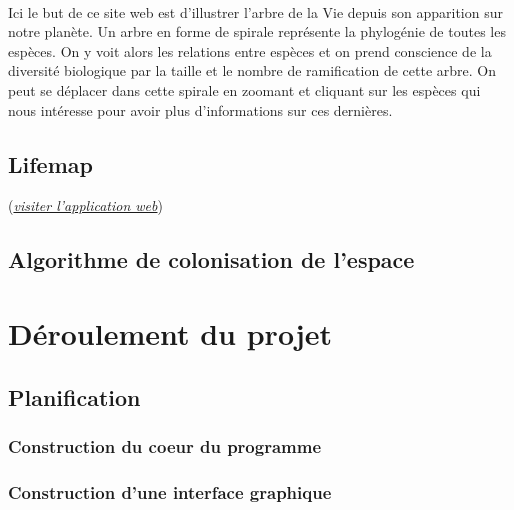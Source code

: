 \documentclass[a4paper]{article}
\begin{document}
	\paragraph{}
	Ici le but de ce site web est d'illustrer l'arbre de la Vie depuis son apparition sur notre planète. Un arbre en forme de spirale représente la phylogénie de toutes les espèces. On y voit alors les relations entre espèces et on prend conscience de la diversité biologique par la taille et le nombre de ramification de cette arbre. On peut se déplacer dans cette spirale en zoomant et cliquant sur les espèces qui nous intéresse pour avoir plus d'informations sur ces dernières.    	

	\subsection{Lifemap}
	(\href{http://lifemap.univ-lyon1.fr/}{\emph{visiter l'application web}})
	\paragraph{}
		

	\subsection{Algorithme de colonisation de l'espace}
	\paragraph{}


\section{Déroulement du projet}
	
	\subsection{Planification}

		
		\subsubsection{Construction du coeur du programme}

			

		\subsubsection{Construction d’une interface graphique}
\end{document}
